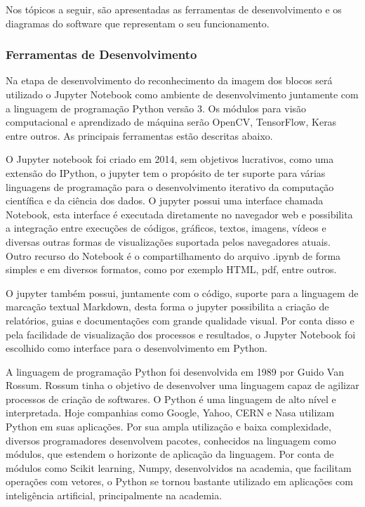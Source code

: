     Nos tópicos a seguir, são apresentadas as ferramentas de desenvolvimento e os diagramas do software que representam o seu funcionamento.
        
        
        \subsubsection{Ferramentas de Desenvolvimento}
        
        Na etapa de desenvolvimento do reconhecimento da imagem dos blocos será utilizado o Jupyter Notebook como ambiente de desenvolvimento juntamente com a linguagem de programação Python versão 3. Os módulos para visão computacional e aprendizado de máquina serão OpenCV, TensorFlow, Keras entre outros. As principais ferramentas estão descritas abaixo.
        
    
    
            O Jupyter notebook foi criado em 2014, sem objetivos lucrativos, como uma extensão do IPython, o jupyter tem o propósito de ter suporte para várias linguagens de programação para o desenvolvimento iterativo da computação científica e da ciência dos dados. O jupyter possui uma interface chamada Notebook, esta interface é executada diretamente no navegador web e possibilita a integração entre  execuções de códigos, gráficos, textos, imagens, vídeos e diversas outras formas de visualizações suportada pelos navegadores atuais. Outro recurso do Notebook é o compartilhamento do arquivo .ipynb de forma simples e em diversos formatos, como por exemplo HTML, pdf, entre outros.
            
        	O jupyter também possui, juntamente com o código, suporte para a linguagem de marcação textual Markdown, desta forma o jupyter possibilita a criação de relatórios, guias e documentações com grande qualidade visual.  Por conta disso e pela facilidade de visualização dos processos e resultados, o Jupyter Notebook foi escolhido como interface para o desenvolvimento em Python. 
                
            A linguagem de programação Python foi desenvolvida em 1989 por Guido Van Rossum. Rossum tinha o objetivo de desenvolver uma linguagem capaz de agilizar processos de criação de softwares. 
        	O Python é uma linguagem de alto nível e interpretada. Hoje companhias como Google, Yahoo, CERN e Nasa utilizam Python em suas aplicações. Por sua ampla utilização e baixa complexidade, diversos programadores desenvolvem pacotes, conhecidos na linguagem como módulos, que estendem o horizonte de aplicação da linguagem. Por conta de módulos como Scikit learning, Numpy, desenvolvidos na academia, que facilitam operações com vetores, o Python se tornou bastante utilizado em aplicações com inteligência artificial,  principalmente na academia.
        	
